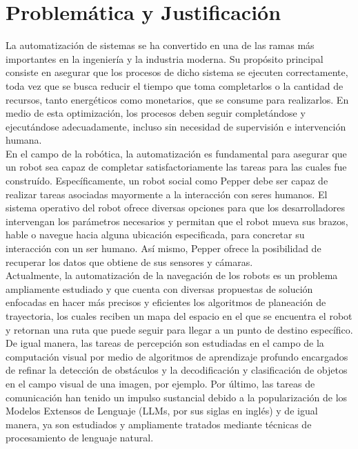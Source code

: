 \section{Problemática y Justificación}

La automatización de sistemas se ha convertido en una de las ramas más importantes en la ingeniería y la industria moderna. Su propósito principal consiste en asegurar que los procesos de dicho sistema se ejecuten correctamente, toda vez que se busca reducir el tiempo que toma completarlos o la cantidad de recursos, tanto energéticos como monetarios, que se consume para realizarlos. En medio de esta optimización, los procesos deben seguir completándose y ejecutándose adecuadamente, incluso sin necesidad de supervisión e intervención humana.\\

En el campo de la robótica, la automatización es fundamental para asegurar que un robot sea capaz de completar satisfactoriamente las tareas para las cuales fue construído. Específicamente, un robot social como Pepper debe ser capaz de realizar tareas asociadas mayormente a la interacción con seres humanos. El sistema operativo del robot ofrece diversas opciones para que los desarrolladores intervengan los parámetros necesarios y permitan que el robot mueva sus brazos, hable o navegue hacia alguna ubicación especificada, para concretar su interacción con un ser humano. Así mismo, Pepper ofrece la posibilidad de recuperar los datos que obtiene de sus sensores y cámaras.\\

Actualmente, la automatización de la navegación de los robots es un problema ampliamente estudiado y que cuenta con diversas propuestas de solución enfocadas en hacer más precisos y eficientes los algoritmos de planeación de trayectoria, los cuales reciben un mapa del espacio en el que se encuentra el robot y retornan una ruta que puede seguir para llegar a un punto de destino específico. De igual manera, las tareas de percepción son estudiadas en el campo de la computación visual por medio de algoritmos de aprendizaje profundo encargados de refinar la detección de obstáculos y la decodificación y clasificación de objetos en el campo visual de una imagen, por ejemplo. Por último, las tareas de comunicación han tenido un impulso sustancial debido a la popularización de los Modelos Extensos de Lenguaje (LLMs, por sus siglas en inglés) y de igual manera, ya son estudiados y ampliamente tratados mediante técnicas de procesamiento de lenguaje natural.\\


